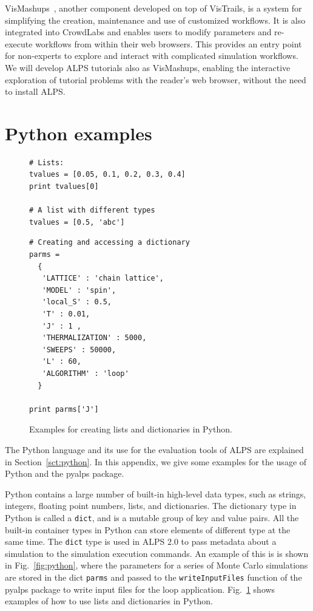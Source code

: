 \documentclass[12pt]{iopart}
\begin{document}
VisMashups~\cite{Santos09}, another component developed on top of VisTrails, is a system for simplifying the creation,
maintenance and use of customized workflows. It is also
integrated into CrowdLabs and enables users to modify parameters and
re-execute workflows from within their web browsers. This provides an
entry point for non-experts to explore and interact with complicated
simulation workflows. We will develop ALPS tutorials also as VisMashups, enabling the interactive exploration of tutorial problems with the reader's web browser, without the need to install ALPS.

\section{Python examples}

\begin{figure}
\begin{multicols}{2}
\begin{lstlisting}
# Lists:
tvalues = [0.05, 0.1, 0.2, 0.3, 0.4]
print tvalues[0]

# A list with different types
tvalues = [0.5, 'abc']
\end{lstlisting}
\columnbreak
\begin{lstlisting}
# Creating and accessing a dictionary
parms =
  { 
   'LATTICE' : 'chain lattice',
   'MODEL' : 'spin',
   'local_S' : 0.5,
   'T' : 0.01,
   'J' : 1 ,
   'THERMALIZATION' : 5000,
   'SWEEPS' : 50000,
   'L' : 60,
   'ALGORITHM' : 'loop'
  }

print parms['J']

\end{lstlisting}
\end{multicols}
\caption{Examples for creating lists and dictionaries in Python.}
\label{fig:listdict}
\end{figure}

The Python language and its use for the evaluation tools of ALPS are explained in Section~\ref{sct:python}. In this appendix, we give some examples for the usage of Python and the pyalps package.

Python contains a large number of built-in high-level data types, such as strings, integers, floating point numbers, lists, and dictionaries. The dictionary type in Python is called a {\tt dict}, and is a mutable group of key and value pairs. All the built-in container types in Python can store elements of different type at the same time. The {\tt dict} type is used in ALPS 2.0 to pass metadata about a simulation to the simulation execution commands. An example of this is is shown in Fig.~\ref{fig:python}, where the parameters for a series of Monte Carlo simulations are stored in the dict {\tt parms} and passed to the {\tt writeInputFiles} function of the pyalps package to write input files for the loop application. Fig.~\ref{fig:listdict} shows examples of how to use lists and dictionaries in Python.
\end{document}
